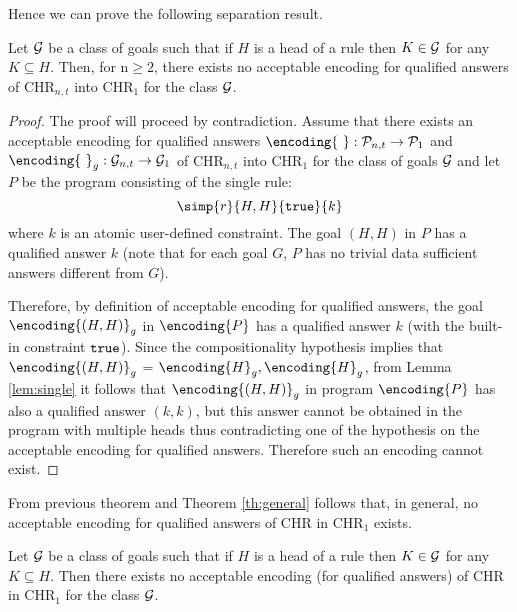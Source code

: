 Hence we can prove the following separation result.


\begin{theorem}
Let ${\cal G}$ be a class of goals such that if  $H$  is a head of a rule then $K \in {\cal G}$ for any $K\subseteq H$. Then, for n$\geq 2$, there exists no acceptable encoding for qualified answers of CHR$_{n,t}$ into CHR$_1$ for the class ${\cal G}$.
\end{theorem}

\begin{proof}
The proof will proceed by contradiction. Assume that there exists an acceptable encoding for qualified answers
$\encoding{\ } :{\cal P}_{n,t} \rightarrow {\cal P}_{1}$ and $\encoding{\ }_g:{\cal G}_{n,t} \rightarrow {\cal G}_{1}$
 of CHR$_{n,t}$ into CHR$_1$ for the class of goals ${\cal G}$ and let $P$ be the program consisting of the single rule:
$$\simp{r}{H, H}{{\tt true}}{k}$$ where $k$ is an atomic user-defined constraint. The goal $(H, H)$ in $P$ has a qualified answer $k$ (note that for each goal $G$, $P$ has no trivial data sufficient answers different from $G$).

Therefore, by definition of acceptable encoding for qualified answers, the goal
  $\encoding{(H, H)}_g$ in $\encoding{P}$ has a qualified answer $k$ (with the built-in constraint ${\tt true}$).
Since the compositionality hypothesis implies that  $\encoding{(H, H)}_g$ =
$\encoding{H}_g, \encoding{H}_g$, from Lem\-ma \ref{lem:single} it follows that $\encoding{(H, H)}_g$ in program $\encoding{P}$ has also a qualified answer $(k, k)$, but this answer cannot be obtained in the program with multiple heads thus contradicting one of the hypothesis on the acceptable encoding for qualified answers.
Therefore such an encoding cannot exist.
\end{proof}

From previous theorem and Theorem \ref{th:general} follows that, in general, no acceptable encoding for qualified answers of CHR in CHR$_1$ exists.

\begin{corollary}\label{ch:general1}
Let ${\cal G}$ be a class of goals such that if  $H$  is a head of a rule then $K \in {\cal G}$ for any $K\subseteq H$. Then there exists no acceptable encoding (for qualified answers) of
CHR in CHR$_1$ for the class ${\cal G}$.
\end{corollary}


